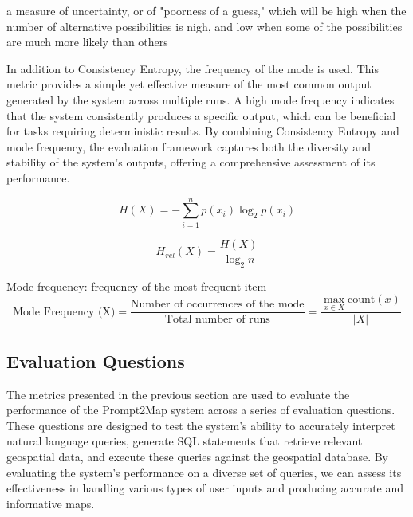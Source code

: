 a measure of uncertainty, or of "poorness of a guess," which will be high when the number of alternative possibilities is nigh, and low when some of the possibilities are much more likely than others

In addition to Consistency Entropy, the frequency of the mode is used. This metric provides a simple yet effective measure of the most common output generated by the system across multiple runs. A high mode frequency indicates that the system consistently produces a specific output, which can be beneficial for tasks requiring deterministic results. By combining Consistency Entropy and mode frequency, the evaluation framework captures both the diversity and stability of the system's outputs, offering a comprehensive assessment of its performance.

\begin{equation}
    H(X) = - \sum_{i=1}^{n} p(x_i) \log_2 p(x_i)
\end{equation}

\begin{equation}
    H_{rel}(X) = \frac{H(X)}{\log_2 n} 
\end{equation}


Mode frequency: frequency of the most frequent item
\begin{equation}
    \text{Mode Frequency (X)} = \frac{\text{Number of occurrences of the mode}}{\text{Total number of runs}} = \frac{\max_{x \in X} \text{count}(x)}{|X|}
\end{equation}



\subsection{Evaluation Questions}

The metrics presented in the previous section are used to evaluate the performance of the Prompt2Map system across a series of evaluation questions. These questions are designed to test the system's ability to accurately interpret natural language queries, generate SQL statements that retrieve relevant geospatial data, and execute these queries against the geospatial database. By evaluating the system's performance on a diverse set of queries, we can assess its effectiveness in handling various types of user inputs and producing accurate and informative maps.

